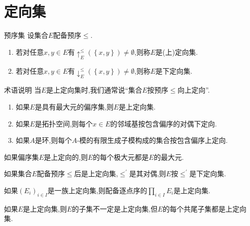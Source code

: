 \section{定向集}

\begin{definition}{预序集}{}
	设集合$E$配备预序$\leq$.
	\begin{enumerate}
		\item 若对任意$x,y\in E$有$\uparrow_{E}^{\leq}\left(\left\{x,y\right\}\right)\neq\emptyset$,则称$E$是(上)定向集.
		\item 若对任意$x,y\in E$有$\downarrow_{E}^{\leq}\left(\left\{x,y\right\}\right)\neq\emptyset$,则称$E$是下定向集.
	\end{enumerate}
\end{definition}

\begin{remark}{术语说明}{}
	当$E$是上定向集时,我们通常说``集合$E$按预序$\leq$向上定向''.
\end{remark}

\begin{example}{}{}
	\begin{enumerate}
		\item 如果$E$是具有最大元的偏序集,则$E$是上定向集.
		\item 如果$E$是拓扑空间,则每个$x\in E$的邻域基按包含偏序的对偶下定向.
		\item 如果$A$是环,则每个$A$-模的有限生成子模构成的集合按包含偏序上定向.
	\end{enumerate}
\end{example}

\begin{proposition}{}{}
	如果偏序集$E$是上定向的,则$E$的每个极大元都是$E$的最大元.
\end{proposition}

\begin{proposition}{}{}
	如果集合$E$配备预序$\leq$后是上定向集,$\leq^{\prime}$是其对偶,则$E$按$\leq^{\prime}$是下定向集.
\end{proposition}

\begin{proposition}{}{}
	如果$\left(E_{i}\right)_{i\in I}$是一族上定向集,则配备逐点序的$\prod\limits_{i\in I}E_{i}$是上定向集.
\end{proposition}

\begin{remark}{}{}
	如果$E$是上定向集,则$E$的子集不一定是上定向集,但$E$的每个共尾子集都是上定向集.
\end{remark}











































